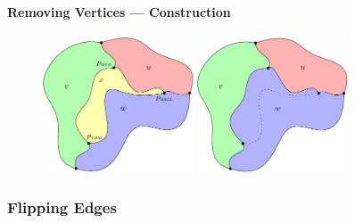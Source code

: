 \documentclass[t,18pt]{beamer}
\newcommand{\emdash}{---}
\begin{document}
\begin{frame}[c]
  \frametitle{}
  \framesubtitle{Removing Vertices \emdash{} Construction}
  \begin{figure}
    \includegraphics[height=4cm]{../Thesis/Resources/RemoveVertex-Illustration-1.pdf}
    \qquad
    \includegraphics[height=4cm]{../Thesis/Resources/RemoveVertex-Illustration-2.pdf}
  \end{figure}
\end{frame}

\subsubsection{Flipping Edges}
\label{subsubsect:flipping-edges}
\end{document}

